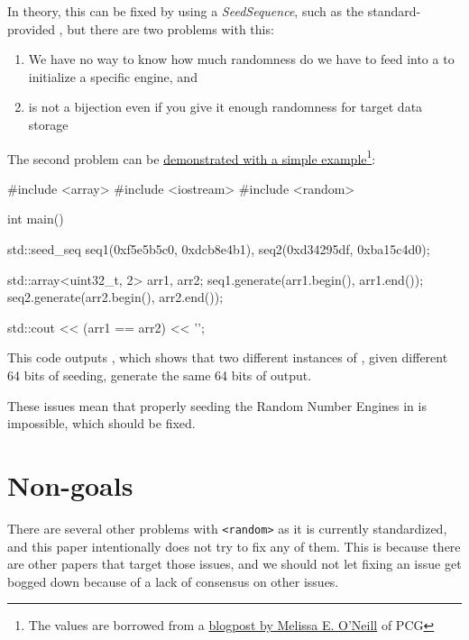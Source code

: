 \documentclass{wg21}
\begin{document}
In theory, this can be fixed by using a \emph{SeedSequence},
such as the standard-provided , but there are two
problems with this:

\begin{enumerate}

\item We have no way to know how much randomness do we have to feed into
a  to initialize a specific engine, and

\item {} is not a bijection even if you give it enough
randomness for target data storage

\end{enumerate}

The second problem can be \href{https://godbolt.org/z/-SCJCI}
{demonstrated with a simple example}\footnote{The values are borrowed
from a \href{http://www.pcg-random.org/posts/cpp-seeding-surprises.html}
{blogpost by Melissa E. O'Neill} of PCG}:

\begin{codeblock}
#include <array>
#include <iostream>
#include <random>

int main() {
    std::seed_seq seq1({0xf5e5b5c0, 0xdcb8e4b1}),
                  seq2({0xd34295df, 0xba15c4d0});

    std::array<uint32_t, 2> arr1, arr2;
    seq1.generate(arr1.begin(), arr1.end());
    seq2.generate(arr2.begin(), arr2.end());

    std::cout << (arr1 == arr2) << '\n';
}
\end{codeblock}

This code outputs , which shows that two different instances
of , given different 64 bits of seeding, generate
the same 64 bits of output.

These issues mean that properly seeding the Random Number Engines in
 is impossible, which should be fixed.


\hypertarget{non-goals}{%
    \section{Non-goals}\label{non-goals}}

There are several other problems with \texttt{<random>} as it is currently
standardized, and this paper intentionally does not try to fix any of them.
This is because there are other papers that target those issues, and we
should not let fixing an issue get bogged down because of a lack of consensus
on other issues.
\end{document}
